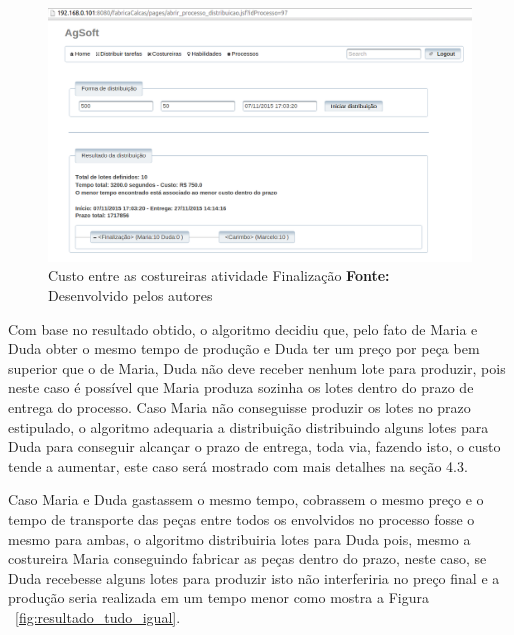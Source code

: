 \begin{figure}[h!]
	\centerline{\includegraphics[scale=0.4]{./imagens/resultado_teste2.png}}
	\caption[Custo entre as costureiras atividade Finalização]
	{Custo entre as costureiras atividade Finalização \textbf{Fonte:} Desenvolvido pelos autores}
	\label{fig:resultado_custo}
\end{figure}

\par Com base no resultado obtido, o algoritmo decidiu que, pelo fato de
Maria e Duda obter o mesmo tempo de produção e Duda ter um preço por peça
bem superior que o de Maria, Duda não deve receber nenhum lote para produzir, pois neste
caso é possível que Maria produza sozinha os lotes dentro do prazo de entrega do
processo. Caso Maria não conseguisse produzir os lotes no prazo estipulado, o
algoritmo adequaria a distribuição distribuindo alguns lotes para Duda para
conseguir alcançar o prazo de entrega, toda via, fazendo isto, o custo tende a
aumentar, este caso será mostrado com mais detalhes na seção 4.3.

\par Caso Maria e Duda gastassem o mesmo tempo, cobrassem o mesmo preço e o tempo de
transporte das peças entre todos os envolvidos no processo fosse o mesmo para ambas, 
o algoritmo distribuiria lotes para Duda pois, mesmo a costureira Maria
conseguindo fabricar as peças dentro do prazo, neste caso, se Duda recebesse alguns lotes para produzir
isto não interferiria no preço final e a produção seria realizada em um tempo menor como mostra a Figura
~\ref{fig:resultado_tudo_igual}.

\newpage

